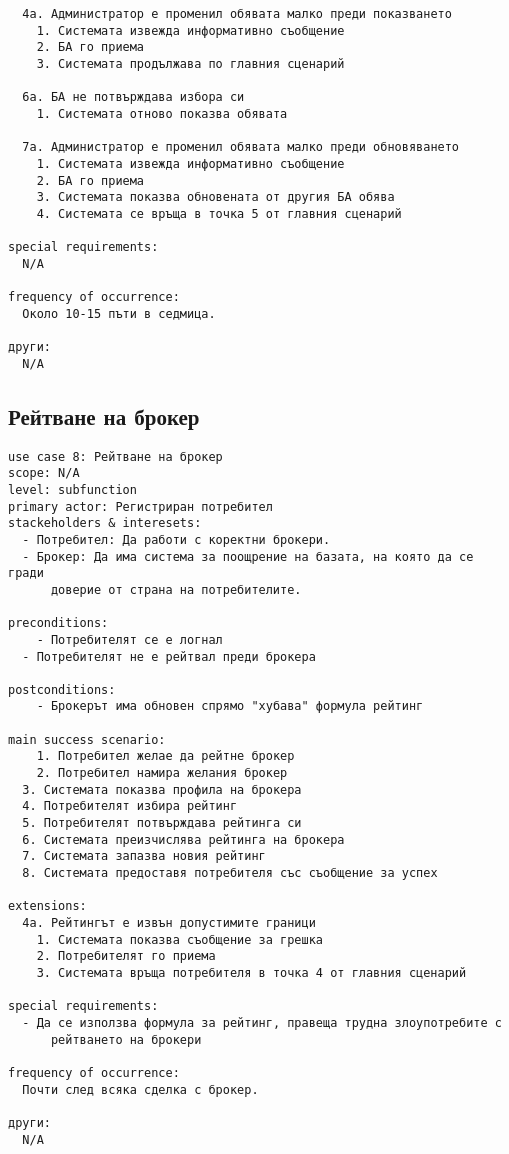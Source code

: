 \documentclass[a4paper,12pt]{article}
\begin{document}
\begin{verbatim}
  4a. Администратор е променил обявата малко преди показването
    1. Системата извежда информативно съобщение
    2. БА го приема
    3. Системата продължава по главния сценарий

  6a. БА не потвърждава избора си
    1. Системата отново показва обявата

  7а. Администратор е променил обявата малко преди обновяването
    1. Системата извежда информативно съобщение
    2. БА го приема
    3. Системата показва обновената от другия БА обява
    4. Системата се връща в точка 5 от главния сценарий

special requirements:
  N/A

frequency of occurrence:
  Около 10-15 пъти в седмица.

други:
  N/A
\end{verbatim}

\subsection{Рейтване на брокер}

\begin{verbatim}
use case 8: Рейтване на брокер
scope: N/A
level: subfunction
primary actor: Регистриран потребител
stackeholders & interesets:
  - Потребител: Да работи с коректни брокери.
  - Брокер: Да има система за поощрение на базата, на която да се гради
      доверие от страна на потребителите.

preconditions:
	- Потребителят се е логнал
  - Потребителят не е рейтвал преди брокера

postconditions:
	- Брокерът има обновен спрямо "хубава" формула рейтинг

main success scenario:
	1. Потребител желае да рейтне брокер
	2. Потребител намира желания брокер
  3. Системата показва профила на брокера
  4. Потребителят избира рейтинг
  5. Потребителят потвърждава рейтинга си
  6. Системата преизчислява рейтинга на брокера
  7. Системата запазва новия рейтинг
  8. Системата предоставя потребителя със съобщение за успех

extensions:
  4a. Рейтингът е извън допустимите граници
    1. Системата показва съобщение за грешка
    2. Потребителят го приема
    3. Системата връща потребителя в точка 4 от главния сценарий

special requirements:
  - Да се използва формула за рейтинг, правеща трудна злоупотребите с
      рейтването на брокери

frequency of occurrence:
  Почти след всяка сделка с брокер.

други:
  N/A
\end{verbatim}
\end{document}
